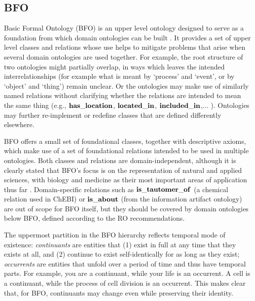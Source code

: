 \subsection*{BFO}

Basic Formal Ontology (BFO) is an upper level ontology designed to serve as a foundation from which domain ontologies can be built \cite{BFO2:Graz}. It provides a set of upper level classes and relations whose use helps to mitigate problems that arise when several domain ontologies are used together.
For example, the root structure of two ontologies might partially overlap, in ways which leaves the intended interrelationships (for example what is meant by `process' and `event', or by `object' and `thing') remain unclear. 
Or the ontologies may make use of similarly named relations without clarifying whether the relations are intended to mean the same thing 
(e.g., $\mathrm{\mathbf{has\_location}}$, $\mathrm{\mathbf{located\_in}}$, $\mathrm{\mathbf{included\_in}}$,... ). Ontologies may further re-implement or redefine classes that are defined differently elsewhere.

BFO offers a small set of foundational classes, together with descriptive axioms, which make use of a set of foundational relations
intended to be used in multiple ontologies. Both classes and relations are domain-independent, although it is clearly stated that BFO's focus is on the representation of natural and applied sciences, with biology and medicine as their most important areas of application thus far .   
Domain-specific relations such as $\mathrm{\mathbf{is\_tautomer\_of}}$ (a chemical relation used in ChEBI) or $\mathrm{\mathbf{is\_about}}$ (from the information artifact ontology) are out of scope for BFO itself, but they should be covered by domain ontologies below BFO, defined according to the RO recommendations.  

The uppermost partition in the BFO hierarchy reflects temporal mode of existence: \textit{continuants} are entities that (1) exist in full at any time that they exists at all, and (2) continue to exist self-identically for as long as they exist; \textit{occurrents} are entities that unfold over a period of time and thus have temporal parts. For example, you are a continuant, while your life is an occurrent.  A cell is a continuant, while the process of cell division is an occurrent. This makes clear that, for BFO, continuants may change even while preserving their identity. 

